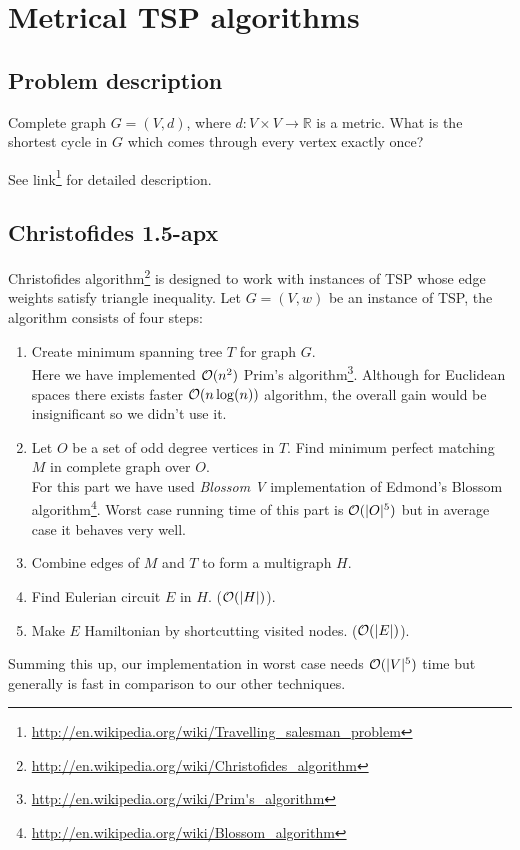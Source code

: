 \chapter{Metrical TSP algorithms}


\section{Problem description}

{ Complete graph $G = (V,d)$, where $d:V \times V \to\mathbb{R}$ is a metric. }
{ What is the shortest cycle in $G$ which comes through every vertex exactly once? }

See link\footnote{\url{http://en.wikipedia.org/wiki/Travelling_salesman_problem}}
for detailed description.

\section{Christofides 1.5-apx}
Christofides algorithm\footnote{\url{http://en.wikipedia.org/wiki/Christofides_algorithm}} is designed to work with instances of TSP whose edge
weights satisfy triangle inequality. Let $G=(V, w)$ be an instance of TSP,
the algorithm consists of four steps:
\begin{enumerate}
\item Create minimum spanning tree $T$ for graph $G$. \\
Here we have implemented $\mathcal{O}(n^2)$ Prim's algorithm\footnote{\url{http://en.wikipedia.org/wiki/Prim's_algorithm}}.
Although for Euclidean spaces there exists faster $\mathcal{O}(n\log(n))$ algorithm, the overall gain
would be insignificant so we didn't use it.
\item Let $O$ be a set of odd degree vertices in $T$.
	  Find minimum perfect matching $M$ in complete graph over $O$. \\
For this part we have used \emph{Blossom V} \cite{BlossomV}
implementation of Edmond's Blossom algorithm\footnote{\url{http://en.wikipedia.org/wiki/Blossom_algorithm}}.
Worst case running time of this part is $\mathcal{O}(|O|^5)$ but in average case it behaves very well.
\item Combine edges of $M$ and $T$ to form a multigraph $H$.
\item Find Eulerian circuit $E$ in $H$. ($\mathcal{O}(|H|)$).
\item Make $E$ Hamiltonian by shortcutting visited nodes. ($\mathcal{O}(|E|)$).
\end{enumerate}
Summing this up, our implementation in worst case needs $\mathcal{O}(|V|^5)$ time but generally
is fast in comparison to our other techniques.

